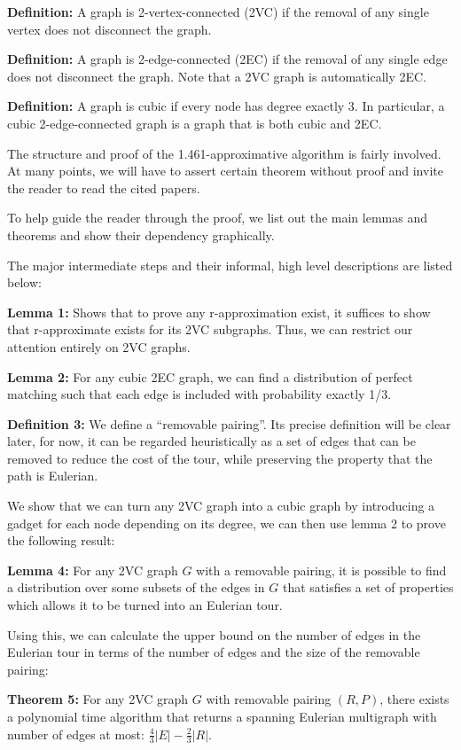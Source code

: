 \documentclass[12pt]{article}
\begin{document}
{\bf Definition:} A graph is 2-vertex-connected (2VC) if the removal of any single vertex does not disconnect the graph.

{\bf Definition:} A graph is 2-edge-connected (2EC) if the removal of any single edge does not disconnect the graph. Note that a 2VC graph is automatically 2EC.

{\bf Definition:} A graph is cubic if every node has degree exactly 3. In particular, a cubic 2-edge-connected graph is a graph that is both cubic and 2EC.

The structure and proof of the 1.461-approximative algorithm is fairly involved. At many points, we will have to assert certain theorem without proof and invite the reader to read the cited papers.

To help guide the reader through the proof, we list out the main lemmas and theorems and show their dependency graphically.

The major intermediate steps and their informal, high level descriptions are listed below:

{\bf Lemma 1:} Shows that to prove any r-approximation exist, it suffices to show that r-approximate exists for its 2VC subgraphs. Thus, we can restrict our attention entirely on 2VC graphs.

{\bf Lemma 2:} For any cubic 2EC graph, we can find a distribution of perfect matching such that each edge is included with probability exactly 1/3.

{\bf Definition 3:} We define a ``removable pairing''. Its precise definition will be clear later, for now, it can be regarded heuristically as a set of edges that can be removed to reduce the cost of the tour, while preserving the property that the path is Eulerian.

We show that we can turn any 2VC graph into a cubic graph by introducing a gadget for each node depending on its degree, we can then use lemma 2 to prove the following result:

{\bf Lemma 4:} For any 2VC graph $G$ with a removable pairing, it is possible to find a distribution over some subsets of the edges in $G$ that satisfies a set of properties which allows it to be turned into an Eulerian tour.

Using this, we can calculate the upper bound on the number of edges in the Eulerian tour in terms of the number of edges and the size of the removable pairing:

{\bf Theorem 5:} For any 2VC graph $G$ with removable pairing $(R,P)$, there exists a polynomial time algorithm that returns a spanning Eulerian multigraph with number of edges at most: $\frac{4}{3}|E|-\frac{2}{3}|R|$.
\end{document}
